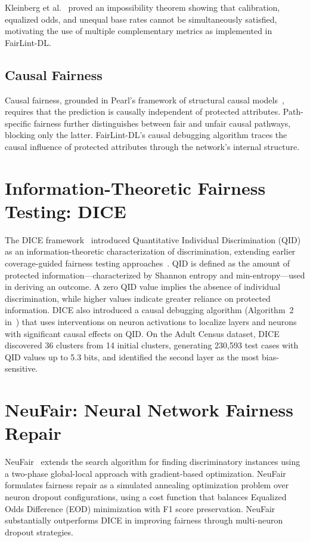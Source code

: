 Kleinberg et al.~\cite{kleinberg2016} proved an impossibility theorem showing that calibration, equalized odds, and unequal base rates cannot be simultaneously satisfied, motivating the use of multiple complementary metrics as implemented in FairLint-DL.

\subsection{Causal Fairness}

Causal fairness, grounded in Pearl's framework of structural causal models~\cite{pearl_2009}, requires that the prediction is causally independent of protected attributes. Path-specific fairness further distinguishes between fair and unfair causal pathways, blocking only the latter. FairLint-DL's causal debugging algorithm traces the causal influence of protected attributes through the network's internal structure.

\section{Information-Theoretic Fairness Testing: DICE}

The DICE framework~\cite{dice} introduced Quantitative Individual Discrimination (QID) as an information-theoretic characterization of discrimination, extending earlier coverage-guided fairness testing approaches~\cite{galhotra2017}. QID is defined as the amount of protected information---characterized by Shannon entropy and min-entropy---used in deriving an outcome. A zero QID value implies the absence of individual discrimination, while higher values indicate greater reliance on protected information. DICE also introduced a causal debugging algorithm (Algorithm~2 in~\cite{dice}) that uses interventions on neuron activations to localize layers and neurons with significant causal effects on QID. On the Adult Census dataset, DICE discovered 36 clusters from 14 initial clusters, generating 230,593 test cases with QID values up to 5.3 bits, and identified the second layer as the most bias-sensitive.

\section{NeuFair: Neural Network Fairness Repair}

NeuFair~\cite{neufair} extends the search algorithm for finding discriminatory instances using a two-phase global-local approach with gradient-based optimization. NeuFair formulates fairness repair as a simulated annealing optimization problem over neuron dropout configurations, using a cost function that balances Equalized Odds Difference (EOD) minimization with F1 score preservation. NeuFair substantially outperforms DICE in improving fairness through multi-neuron dropout strategies.

